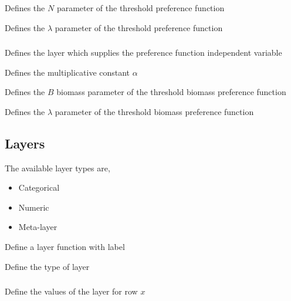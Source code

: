  {Defines the $N$ parameter of the threshold preference function}

 {Defines the $\lambda$ parameter of the threshold preference function}

\subsubsection[Threshold-biomass]{}

 {Defines the layer which supplies the preference function independent variable}

 {Defines the multiplicative constant $\alpha$}

 {Defines the $B$ biomass parameter of the threshold biomass preference function}

 {Defines the $\lambda$ parameter of the threshold biomass preference function}

\subsection{Layers}

The available layer types  are, 

\begin{itemize}
	\item Categorical
	\item Numeric
	\item Meta-layer
\end{itemize}

 {Define a layer function with label}

 {Define the type of layer}

\subsubsection[Categorical]{}

 {Define the values of the layer for row $x$}

